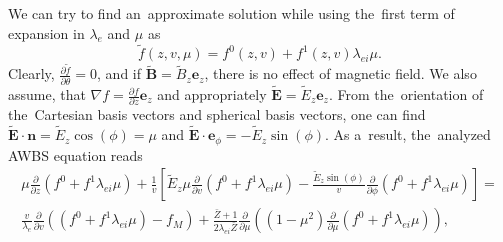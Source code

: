 \documentclass[preprint,12pt]{elsarticle}
\newcommand{\pdv}[2]{\frac{\partial{#1}}{\partial{#2}}}
\newcommand{\vect}[1]{\boldsymbol{#1}}
\newcommand{\mfpe}{\lambda_e}
\newcommand{\mfpei}{\lambda_{ei}}
\newcommand{\Zbar}{\bar{Z}}
\newcommand{\vmag}{v}
\newcommand{\vn}{\vect{n}}
\newcommand{\tE}{\vect{\tilde{E}}}
\newcommand{\tB}{\vect{\tilde{B}}}
\newcommand{\fM}{f_M}
\newcounter{bla}
\begin{document}
We can try to find an~approximate solution while using the~first term of
expansion in $\mfpe$ and $\mu$ as
\begin{equation}
  \tilde{f}(z, \vmag, \mu) = f^0(z, \vmag) + f^1(z, \vmag) \mfpei\mu .
  \label{eq:f_approximation}
\end{equation}
Clearly, $\pdv{\tilde{f}}{\theta} = 0$, and if $\tB = \tilde{B}_z\vect{e}_z$, 
there is no effect of magnetic field. We also assume, that 
$\nabla f = \pdv{f}{z}\vect{e}_z$ and appropriately 
$\tE = \tilde{E}_z\vect{e}_z$.
From the~orientation of the~Cartesian basis vectors and spherical 
basis vectors, one can find $\tE\cdot\vn = \tilde{E}_z \cos(\phi) = \mu$ and
$\tE\cdot\vect{e}_\phi = -\tilde{E}_z\sin(\phi)$. As a~result, the~analyzed
AWBS equation reads
\begin{multline}
  \mu\pdv{}{z}\left( f^0 + f^1 \mfpei\mu \right) 
  + \frac{1}{\vmag} \left[ \tilde{E}_z\mu \pdv{}{\vmag} 
  \left( f^0 + f^1 \mfpei\mu \right) 
  - \frac{\tilde{E}_z\sin(\phi)}{\vmag}\pdv{}{\phi} 
  \left( f^0 + f^1 \mfpei\mu \right)
  \right] 
  =\\
  \frac{\vmag}{\mfpe}\pdv{}{\vmag}
  \left(\left( f^0 + f^1 \mfpei\mu \right) -\fM\right)
  + \frac{\Zbar +1}{2 \mfpei \Zbar}\pdv{}{\mu}\left((1 - \mu^2)
  \pdv{}{\mu}\left( f^0 + f^1 \mfpei\mu \right) \right) ,
  \label{eq:AWBS_spherical}
\end{multline}
\end{document}
